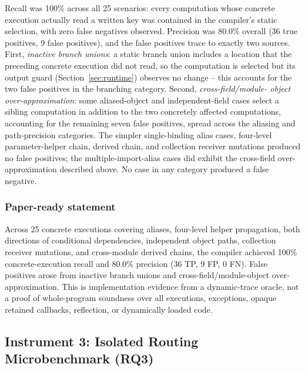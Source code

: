 \documentclass[conference]{IEEEtran}
\begin{document}
Recall was 100\% across all 25 scenarios: every computation whose concrete
execution actually read a written key was contained in the compiler's
static selection, with zero false negatives observed. Precision was 80.0\%
overall (36 true positives, 9 false positives), and the false positives
trace to exactly two sources. First, \emph{inactive branch unions}: a static
branch union includes a location that the preceding concrete execution did
not read, so the computation is selected but its output guard
(Section~\ref{sec:runtime}) observes no change -- this accounts for the two
false positives in the branching category. Second, \emph{cross-field/module-
object over-approximation}: some aliased-object and independent-field cases
select a sibling computation in addition to the two concretely affected
computations, accounting for the remaining seven false positives, spread
across the aliasing and path-precision categories. The simpler single-binding
alias cases, four-level parameter-helper chain, derived chain, and collection
receiver mutations produced no false positives; the multiple-import-alias
cases did exhibit the cross-field over-approximation described above. No case
in any category produced a false negative.

\subsubsection{Paper-ready statement}
Across 25 concrete executions covering aliases, four-level helper
propagation, both directions of conditional dependencies, independent object
paths, collection receiver mutations, and cross-module derived chains, the
compiler achieved 100\% concrete-execution recall and 80.0\% precision (36
TP, 9 FP, 0 FN). False positives arose from inactive branch unions and
cross-field/module-object over-approximation. This is implementation
evidence from a dynamic-trace oracle, not a proof of whole-program soundness
over all executions, exceptions, opaque retained callbacks, reflection, or
dynamically loaded code.

\subsection{Instrument 3: Isolated Routing Microbenchmark (RQ3)}
\label{sec:microbench}
\end{document}
